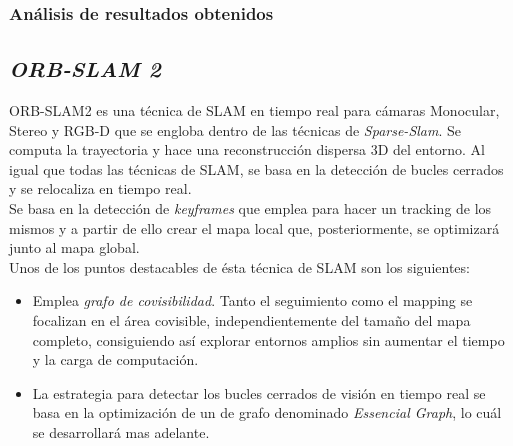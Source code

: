 \subsubsection{Análisis de resultados obtenidos}

\newpage
\subsection{\textit{ORB-SLAM 2}}
ORB-SLAM2 es una técnica de SLAM en tiempo real para cámaras Monocular, Stereo y RGB-D que se engloba dentro de las técnicas de 
\textit{Sparse-Slam}. Se computa la trayectoria y hace una reconstrucción dispersa 3D del entorno. Al igual que todas las técnicas 
de SLAM, se basa en la detección de bucles cerrados y  se relocaliza en tiempo real. \\
Se basa en la detección de \textit{keyframes} que emplea para hacer un tracking de los mismos y a partir de ello crear el 
mapa local que, posteriormente, se optimizará junto al mapa global. \\
Unos de los puntos destacables de ésta técnica de SLAM son los siguientes:
\begin{itemize}
    \item Emplea \textit{grafo de covisibilidad}. Tanto el seguimiento como el mapping se focalizan en el área covisible,
    independientemente del tamaño del mapa completo, consiguiendo así explorar entornos amplios sin
    aumentar el tiempo y la carga de computación.

    \item La estrategia para detectar los bucles cerrados de visión en tiempo real se basa en la optimización de
   un de grafo denominado \textit{Essencial Graph}, lo cuál se desarrollará mas adelante.
\end{itemize}

